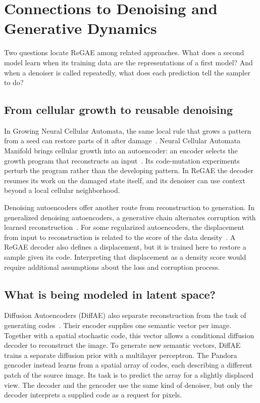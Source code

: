 \section{Connections to Denoising and Generative Dynamics}
\label{sec:related}

Two questions locate ReGAE among related approaches. What does a second model learn when its training data are the representations of a first model? And when a denoiser is called repeatedly, what does each prediction tell the sampler to do?

\subsection{From cellular growth to reusable denoising}

In Growing Neural Cellular Automata, the same local rule that grows a pattern from a seed can restore parts of it after damage~\cite{nca}. Neural Cellular Automata Manifold brings cellular growth into an autoencoder: an encoder selects the growth program that reconstructs an input~\cite{ncam}. Its code-mutation experiments perturb the program rather than the developing pattern. In ReGAE the decoder resumes its work on the damaged state itself, and its denoiser can use context beyond a local cellular neighborhood.

Denoising autoencoders offer another route from reconstruction to generation. In generalized denoising autoencoders, a generative chain alternates corruption with learned reconstruction~\cite{dae}. For some regularized autoencoders, the displacement from input to reconstruction is related to the score of the data density~\cite{alain}. A ReGAE decoder also defines a displacement, but it is trained here to restore a sample given its code. Interpreting that displacement as a density score would require additional assumptions about the loss and corruption process.

\subsection{What is being modeled in latent space?}

Diffusion Autoencoders (DiffAE) also separate reconstruction from the task of generating codes~\cite{diffae}. Their encoder supplies one semantic vector per image. Together with a spatial stochastic code, this vector allows a conditional diffusion decoder to reconstruct the image. To generate new semantic vectors, DiffAE trains a separate diffusion prior with a multilayer perceptron. The Pandora gencoder instead learns from a spatial array of codes, each describing a different patch of the source image. Its task is to predict the array for a slightly displaced view. The decoder and the gencoder use the same kind of denoiser, but only the decoder interprets a supplied code as a request for pixels.

